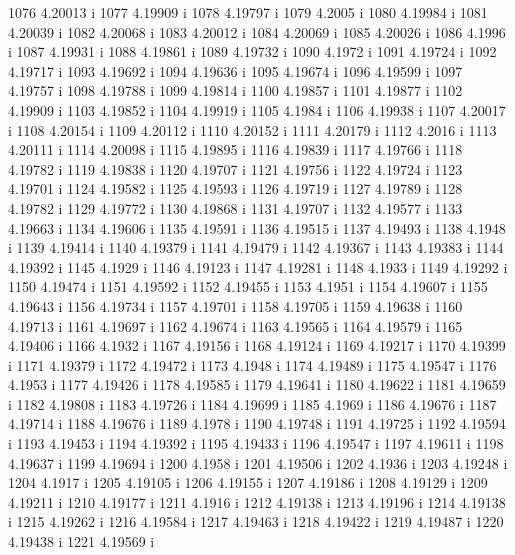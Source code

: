  1076  4.20013  i
 1077  4.19909  i
 1078  4.19797  i
 1079  4.2005  i
 1080  4.19984  i
 1081  4.20039  i
 1082  4.20068  i
 1083  4.20012  i
 1084  4.20069  i
 1085  4.20026  i
 1086  4.1996  i
 1087  4.19931  i
 1088  4.19861  i
 1089  4.19732  i
 1090  4.1972  i
 1091  4.19724  i
 1092  4.19717  i
 1093  4.19692  i
 1094  4.19636  i
 1095  4.19674  i
 1096  4.19599  i
 1097  4.19757  i
 1098  4.19788  i
 1099  4.19814  i
 1100  4.19857  i
 1101  4.19877  i
 1102  4.19909  i
 1103  4.19852  i
 1104  4.19919  i
 1105  4.1984  i
 1106  4.19938  i
 1107  4.20017  i
 1108  4.20154  i
 1109  4.20112  i
 1110  4.20152  i
 1111  4.20179  i
 1112  4.2016  i
 1113  4.20111  i
 1114  4.20098  i
 1115  4.19895  i
 1116  4.19839  i
 1117  4.19766  i
 1118  4.19782  i
 1119  4.19838  i
 1120  4.19707  i
 1121  4.19756  i
 1122  4.19724  i
 1123  4.19701  i
 1124  4.19582  i
 1125  4.19593  i
 1126  4.19719  i
 1127  4.19789  i
 1128  4.19782  i
 1129  4.19772  i
 1130  4.19868  i
 1131  4.19707  i
 1132  4.19577  i
 1133  4.19663  i
 1134  4.19606  i
 1135  4.19591  i
 1136  4.19515  i
 1137  4.19493  i
 1138  4.1948  i
 1139  4.19414  i
 1140  4.19379  i
 1141  4.19479  i
 1142  4.19367  i
 1143  4.19383  i
 1144  4.19392  i
 1145  4.1929  i
 1146  4.19123  i
 1147  4.19281  i
 1148  4.1933  i
 1149  4.19292  i
 1150  4.19474  i
 1151  4.19592  i
 1152  4.19455  i
 1153  4.1951  i
 1154  4.19607  i
 1155  4.19643  i
 1156  4.19734  i
 1157  4.19701  i
 1158  4.19705  i
 1159  4.19638  i
 1160  4.19713  i
 1161  4.19697  i
 1162  4.19674  i
 1163  4.19565  i
 1164  4.19579  i
 1165  4.19406  i
 1166  4.1932  i
 1167  4.19156  i
 1168  4.19124  i
 1169  4.19217  i
 1170  4.19399  i
 1171  4.19379  i
 1172  4.19472  i
 1173  4.1948  i
 1174  4.19489  i
 1175  4.19547  i
 1176  4.1953  i
 1177  4.19426  i
 1178  4.19585  i
 1179  4.19641  i
 1180  4.19622  i
 1181  4.19659  i
 1182  4.19808  i
 1183  4.19726  i
 1184  4.19699  i
 1185  4.1969  i
 1186  4.19676  i
 1187  4.19714  i
 1188  4.19676  i
 1189  4.1978  i
 1190  4.19748  i
 1191  4.19725  i
 1192  4.19594  i
 1193  4.19453  i
 1194  4.19392  i
 1195  4.19433  i
 1196  4.19547  i
 1197  4.19611  i
 1198  4.19637  i
 1199  4.19694  i
 1200  4.1958  i
 1201  4.19506  i
 1202  4.1936  i
 1203  4.19248  i
 1204  4.1917  i
 1205  4.19105  i
 1206  4.19155  i
 1207  4.19186  i
 1208  4.19129  i
 1209  4.19211  i
 1210  4.19177  i
 1211  4.1916  i
 1212  4.19138  i
 1213  4.19196  i
 1214  4.19138  i
 1215  4.19262  i
 1216  4.19584  i
 1217  4.19463  i
 1218  4.19422  i
 1219  4.19487  i
 1220  4.19438  i
 1221  4.19569  i

